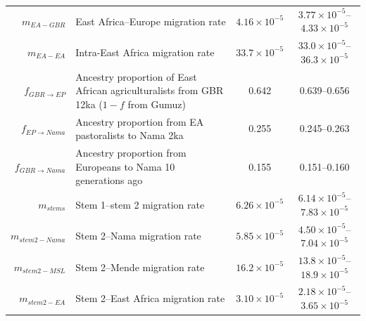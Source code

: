 \documentclass[]{article}
\begin{document}
\begin{table}[ht]
\begin{tabular}[t]{rP{8cm}cc}
    $m_{EA-GBR}$ & East Africa--Europe migration rate & $4.16\times10^{-5}$ & $3.77\times10^{-5}$--$4.33\times10^{-5}$ \\
    $m_{EA-EA}$ & Intra-East Africa migration rate & $33.7\times10^{-5}$ & $33.0\times10^{-5}$--$36.3\times10^{-5}$ \\
    $f_{GBR \rightarrow EP}$ & Ancestry proportion of East African agriculturalists from GBR 12ka ($1-f$ from Gumuz) & 0.642 & 0.639--0.656 \\
    $f_{EP \rightarrow Nama}$ & Ancestry proportion from EA pastoralists to Nama 2ka & 0.255 & 0.245--0.263 \\
    $f_{GBR \rightarrow Nama}$ & Ancestry proportion from Europeans to Nama 10 generations ago & 0.155 & 0.151--0.160 \\
    $m_{stems}$ & Stem 1--stem 2 migration rate & $6.26\times10^{-5}$ & $6.14\times10^{-5}$--$7.83\times10^{-5}$ \\
    $m_{stem2-Nama}$ & Stem 2--Nama migration rate & $5.85\times10^{-5}$ & $4.50\times10^{-5}$--$7.04\times10^{-5}$ \\
    $m_{stem2-MSL}$ & Stem 2--Mende migration rate & $16.2\times10^{-5}$ & $13.8\times10^{-5}$--$18.9\times10^{-5}$ \\
    $m_{stem2-EA}$ & Stem 2--East Africa migration rate & $3.10\times10^{-5}$ & $2.18\times10^{-5}$--$3.65\times10^{-5}$ \\
    \bottomrule
\end{tabular}
\end{table}
\end{document}
